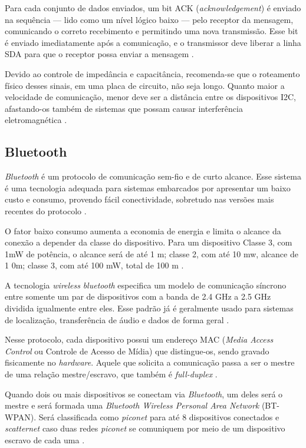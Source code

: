 Para cada conjunto de dados enviados, um bit ACK (\textit{acknowledgement}) é enviado na sequência --- lido como um nível lógico baixo --- pelo receptor da mensagem, comunicando o correto recebimento e permitindo uma nova transmissão. Esse bit é enviado imediatamente após a comunicação, e o transmissor deve liberar a linha SDA para que o receptor possa enviar a mensagem \cite{man:texasI2C}. 

Devido ao controle de impedância e capacitância, recomenda-se que o roteamento físico desses sinais, em uma placa de circuito, não seja longo. Quanto maior a velocidade de comunicação, menor deve ser a distância entre os dispositivos I2C, afastando-os também de sistemas que possam causar interferência eletromagnética \cite{site:altiumpcb}.

\subsection{Bluetooth}

\textit{Bluetooth} é um protocolo de comunicação sem-fio e de curto alcance. Esse sistema é uma tecnologia adequada para sistemas embarcados por apresentar um baixo custo e consumo, provendo fácil conectividade, sobretudo nas versões mais recentes do protocolo \cite{diss:ClaudioBluetooth}. 

O fator baixo consumo aumenta a economia de energia e limita o alcance da conexão a depender da classe do dispositivo. Para um dispositivo Classe 3, com 1mW de potência, o alcance será de até 1 m; classe 2, com até 10 mw, alcance de 1 0m; classe 3, com até 100 mW, total de 100 m \cite{tcc:tier2019}.

A tecnologia \textit{wireless} \textit{bluetooth} especifica um modelo de comunicação síncrono entre somente um par de dispositivos com a banda de 2.4 GHz a 2.5 GHz dividida igualmente entre eles. Esse padrão já é geralmente usado para sistemas de localização, transferência de áudio e dados de forma geral \cite{book:BluetoothDemystified}.

Nesse protocolo, cada dispositivo possui um endereço MAC (\textit{Media Access Control} ou Controle de Acesso de Mídia) que distingue-os, sendo gravado fisicamente no \textit{hardware}. Aquele que solicita a comunicação passa a ser o mestre de uma relação mestre/escravo, que também é \textit{full-duplex} \cite{diss:ClaudioBluetooth}. 

Quando dois ou mais dispositivos se conectam via \textit{Bluetooth}, um deles será o mestre e será formada uma \textit{Bluetooth Wireless Personal Area Network} (BT-WPAN). Será classificada como \textit{piconet} para até 8 dispositivos conectados e \textit{scatternet} caso duas redes \textit{piconet} se comuniquem por meio de um dispositivo escravo de cada uma \cite{tcc:tier2019}. 

